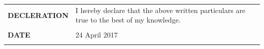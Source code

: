 \documentclass[a4paper]{article}
\begin{document}
\begin{longtable}{@{}m{3.0cm}m{14cm}@{}}
			
			\textrm{\textbf {DECLERATION}} & I hereby declare that the above written particulars are true to the best of my knowledge.
			\\ \\
			
			\textrm{\textbf {DATE}} & 24 April 2017
			\\ \\
			\end{longtable}
\end{document}
